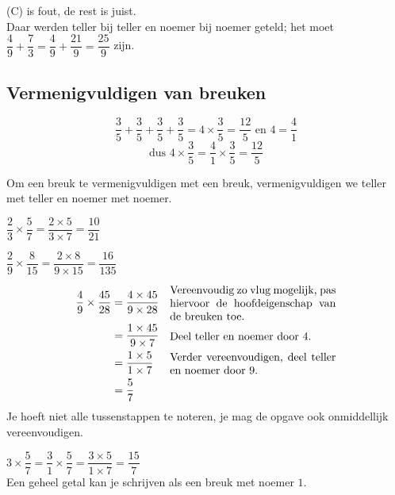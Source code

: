 \documentclass{bis}
\begin{document}
\begin{solution}
(C) is fout, de rest is juist.\\
Daar werden teller bij teller en noemer bij noemer geteld; het moet
$\dfrac{4}{9}+\dfrac{7}{3}=\dfrac{4}{9}+\dfrac{21}{9}=\dfrac{25}{9}$ zijn.
\end{solution}

\subsection{Vermenigvuldigen van breuken}
\[\dfrac{3}{5}+\dfrac{3}{5}+\dfrac{3}{5}+\dfrac{3}{5}=4\times\dfrac{3}{5}=\dfrac{12}{5} \text{ en } 4=\dfrac{4}{1}\]
\[\text{dus } 4\times\dfrac{3}{5}=\dfrac{4}{1}\times\dfrac{3}{5}=\dfrac{12}{5}\]

\begin{onthoud}
Om een breuk te vermenigvuldigen met een breuk, vermenigvuldigen we teller met teller en noemer met noemer.
\end{onthoud}

\begin{voorbeeld}
$\dfrac{2}{3}\times\dfrac{5}{7}=\dfrac{2\times 5}{3\times 7}=\dfrac{10}{21}$
\end{voorbeeld}

\begin{voorbeeld}
$\dfrac{2}{9}\times\dfrac{8}{15}=\dfrac{2\times 8}{9\times 15}=\dfrac{16}{135}$
\end{voorbeeld}

\begin{voorbeeld}
\vspace*{-1cm}
\begin{align*}
  \dfrac{4}{9}\times\dfrac{45}{28} &= \dfrac{4\times 45}{9 \times 28} & \parbox{15em}{Vereenvoudig zo vlug mogelijk, pas hiervoor de hoofdeigenschap van de breuken toe.}\\
                                    &= \dfrac{1\times 45}{9 \times 7} & \parbox{15em}{Deel teller en noemer door 4.}\\
                                    &= \dfrac{1\times 5}{1 \times 7} & \parbox{15em}{Verder vereenvoudigen, deel teller en noemer door 9.}\\
                                    &= \dfrac{5}{7}\\
\end{align*}
Je hoeft niet alle tussenstappen te noteren, je mag de opgave ook onmiddellijk vereenvoudigen.
\end{voorbeeld}

\begin{voorbeeld}
$3\times\dfrac{5}{7}=\dfrac{3}{1}\times\dfrac{5}{7}=\dfrac{3\times 5}{1\times 7}=\dfrac{15}{7}$\\
Een geheel getal kan je schrijven als een breuk met noemer $1$.
\end{voorbeeld}
\end{document}
